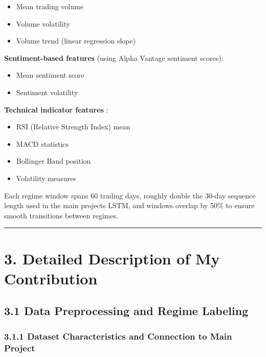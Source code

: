 \documentclass[
]{article}
\begin{document}
\begin{itemize}
\item
  Mean trading volume
\item
  Volume volatility
\item
  Volume trend (linear regression slope)
\end{itemize}

\textbf{Sentiment-based features} (using Alpha Vantage sentiment
scores):

\begin{itemize}
\item
  Mean sentiment score
\item
  Sentiment volatility
\end{itemize}

\textbf{Technical indicator features} :

\begin{itemize}
\item
  RSI (Relative Strength Index) mean
\item
  MACD statistics
\item
  Bollinger Band position
\item
  Volatility measures
\end{itemize}

Each regime window spans 60 trading days, roughly double the 30-day
sequence length used in the main project\textquotesingle s LSTM, and
windows overlap by 50\% to ensure smooth transitions between regimes.

\begin{center}\rule{0.5\linewidth}{0.5pt}\end{center}

\section{3. Detailed Description of My
Contribution}\label{3-detailed-description-of-my-contribution}

\subsection{3.1 Data Preprocessing and Regime
Labeling}\label{31-data-preprocessing-and-regime-labeling}

\subsubsection{3.1.1 Dataset Characteristics and Connection to Main
Project}\label{311-dataset-characteristics-and-connection-to-main-project}
\end{document}
